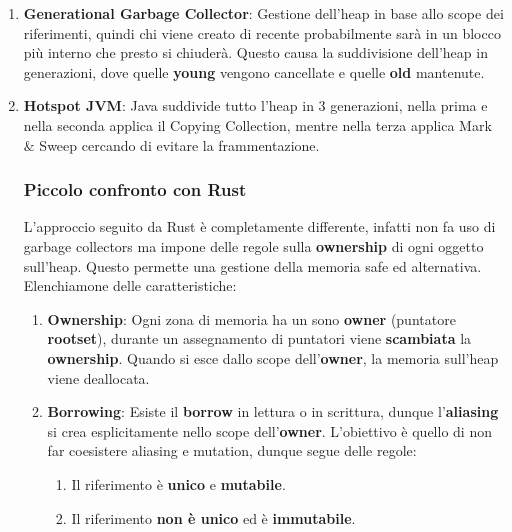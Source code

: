\documentclass{article}
\begin{document}
\begin{enumerate}
\begin{enumerate}
    \end{enumerate}
    \vspace*{10px}
    \item \textbf{Generational Garbage Collector}: Gestione dell'heap in base allo scope dei riferimenti, quindi chi viene creato di recente probabilmente sarà in un blocco più interno che presto si chiuderà. Questo causa la suddivisione dell'heap in generazioni, dove quelle \textbf{young} vengono cancellate e quelle \textbf{old} mantenute.
    \vspace*{10px}
    \item \textbf{Hotspot JVM}: Java suddivide tutto l'heap in $3$ generazioni, nella prima e nella seconda applica il Copying Collection, mentre nella terza applica Mark $\&$ Sweep cercando di evitare la frammentazione.

\newpage

    \subsubsection{Piccolo confronto con Rust}

    L'approccio seguito da Rust è completamente differente, infatti non fa uso di garbage collectors ma impone delle regole sulla \textbf{ownership} di ogni oggetto sull'heap. Questo permette una gestione della memoria safe ed alternativa. Elenchiamone delle caratteristiche:

    \begin{enumerate}
        \item \textbf{Ownership}: Ogni zona di memoria ha un sono \textbf{owner} (puntatore \textbf{rootset}), durante un assegnamento di puntatori viene \textbf{scambiata} la \textbf{ownership}. Quando si esce dallo scope dell'\textbf{owner}, la memoria sull'heap viene deallocata.
        \item \textbf{Borrowing}: Esiste il \textbf{borrow} in lettura o in scrittura, dunque l'\textbf{aliasing} si crea esplicitamente nello scope dell'\textbf{owner}. L'obiettivo è quello di non far coesistere aliasing e mutation, dunque segue delle regole:
        \begin{enumerate}
            \item Il riferimento è \textbf{unico} e \textbf{mutabile}.
            \item Il riferimento \textbf{non è unico} ed è \textbf{immutabile}.
        \end{enumerate}
    \end{enumerate}
    
\end{enumerate}
\end{document}
